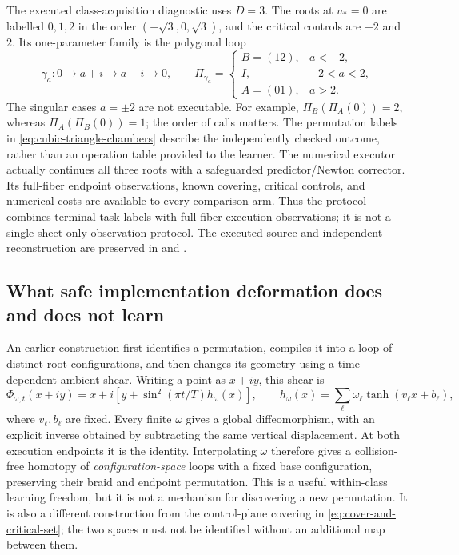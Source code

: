 The executed class-acquisition diagnostic uses $D=3$. The roots at $u_*=0$
are labelled $0,1,2$ in the order $(-\sqrt{3},0,\sqrt{3})$, and the critical
controls are $-2$ and $2$. Its one-parameter family is the polygonal loop
\begin{equation}
 \gamma_a:0\longrightarrow a+i\longrightarrow a-i\longrightarrow0,
 \qquad
 \Pi_{\gamma_a}=
 \begin{cases}
 B=(12),&a<-2,\\
 I,&-2<a<2,\\
 A=(01),&a>2.
 \end{cases}
 \label{eq:cubic-triangle-chambers}
\end{equation}
The singular cases $a=\pm2$ are not executable. For example,
$\Pi_B(\Pi_A(0))=2$, whereas $\Pi_A(\Pi_B(0))=1$; the order of calls matters.
The permutation labels in \eqref{eq:cubic-triangle-chambers} describe the
independently checked outcome, rather than an operation table provided to the
learner. The numerical executor actually continues all three roots with a
safeguarded predictor/Newton corrector. Its full-fiber endpoint observations,
known covering, critical controls, and numerical costs are available to every
comparison arm. Thus the protocol combines terminal task labels with
full-fiber execution observations; it is not a single-sheet-only observation
protocol. The executed source and independent reconstruction are preserved in
and
.

\subsection{What safe implementation deformation does and does not learn}

An earlier construction first identifies a permutation, compiles it into a
loop of distinct root configurations, and then changes its geometry using a
time-dependent ambient shear. Writing a point as $x+iy$, this shear is
\begin{equation}
 \Phi_{\omega,t}(x+iy)
 =x+i\left[y+\sin^2(\pi t/T)h_\omega(x)\right],
 \qquad h_\omega(x)=\sum_\ell\omega_\ell\tanh(v_\ell x+b_\ell),
 \label{eq:safe-ambient-shear}
\end{equation}
where $v_\ell,b_\ell$ are fixed. Every finite $\omega$ gives a global
diffeomorphism, with an explicit inverse obtained by subtracting the same
vertical displacement. At both execution endpoints it is the identity.
Interpolating $\omega$ therefore gives a collision-free homotopy of
\emph{configuration-space} loops with a fixed base configuration, preserving
their braid and endpoint permutation. This is a useful within-class learning
freedom, but it is not a mechanism for discovering a new permutation. It is
also a different construction from the control-plane covering in
\eqref{eq:cover-and-critical-set}; the two spaces must not be identified
without an additional map between them.

